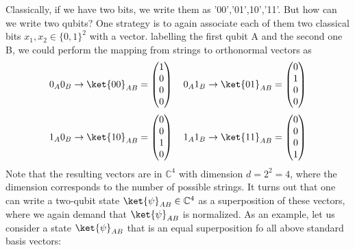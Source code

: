 \documentclass[12pt, oneside]{book}
\theoremstyle{definition}
\theoremstyle{definition}
\theoremstyle{remark}
\begin{document}
Classically, if we have two bits, we write them as '00','01',10','11'. But how can we write two qubits? One strategy is to again associate each of them two classical bits $x_1,x_2 \in \{0,1\}^2$ with a vector. labelling the first qubit A and the second one B, we could perform the mapping from strings to orthonormal vectors as
\[
0_A0_B\rightarrow \ket{00}_{AB}=\begin{pmatrix} 1 \\0 \\0 \\ 0 \end{pmatrix} \quad 0_A1_B\rightarrow \ket{01}_{AB}=\begin{pmatrix} 0 \\ 1 \\ 0 \\ 0 \end{pmatrix}
\]
\[
1_A0_B\rightarrow \ket{10}_{AB}=\begin{pmatrix} 0 \\ 0 \\ 1 \\0 \end{pmatrix} \quad 1_A1_B\rightarrow \ket{11}_{AB}=\begin{pmatrix} 0 \\ 0 \\ 0 \\ 1 \end{pmatrix}
\]
Note that the resulting vectors are in $\mathbb{C}^4$ with dimension $d=2^2=4$, where the dimension corresponds to the number of possible strings. It turns out that one can write a two-qubit state $\ket{\psi}_{AB}\in\mathbb{C}^4$ as a superposition of these vectors, where we again demand that $\ket{\psi}_{AB}$ is normalized. As an example, let us consider a state $\ket{\psi}_{AB}$ that is an equal superposition fo all above standard basis vectors:
\end{document}
